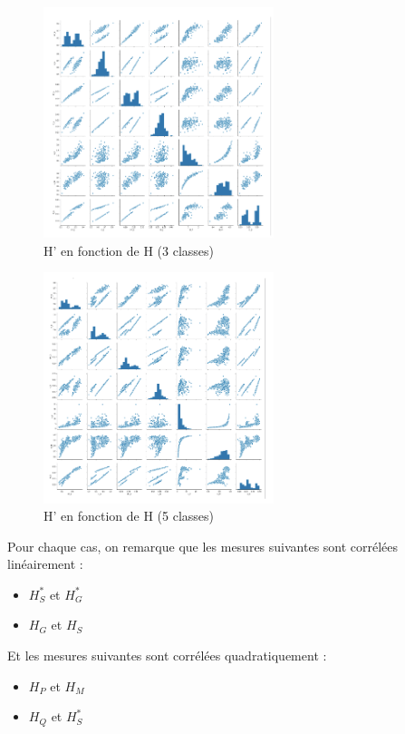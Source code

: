 \documentclass[a4paper]{article}
\begin{document}
\begin{figure}[H]

	\center 
	\includegraphics[width=0.6\textwidth]{images/H_3.png}
    \caption{H' en fonction de H (3 classes)}
    \label{img:H_3}
\end{figure}

\begin{figure}[H]

	\center 
	\includegraphics[width=0.6\textwidth]{images/H_5.png}
    \caption{H' en fonction de H (5 classes)}
    \label{img:H_5}
\end{figure}

Pour chaque cas, on remarque que les mesures suivantes sont corrélées
linéairement :
\begin{itemize}
    \item $H^*_S$ et $H^*_G$
    \item $H_G$ et $H_S$
\end{itemize}

Et les mesures suivantes sont corrélées quadratiquement :
\begin{itemize}
    \item $H_P$ et $H_M$
    \item $H_Q$ et $H^*_S$
\end{itemize}
\end{document}
